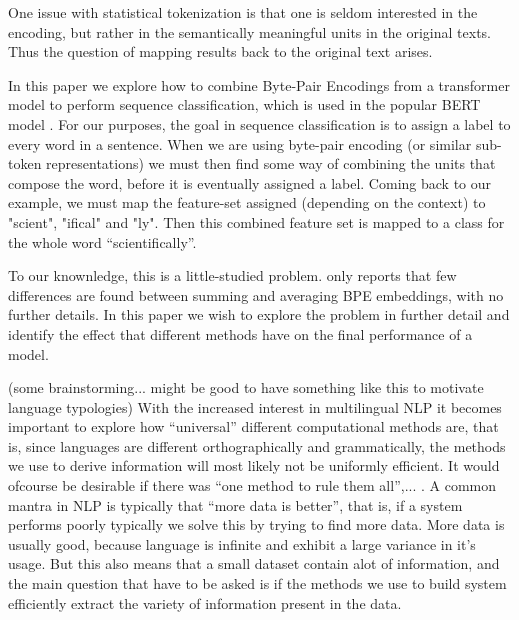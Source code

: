 \documentclass[11pt]{article}
\newcommand\citet{\newcite}
\newcommand\citep{\cite}
\begin{document}
            One issue with statistical tokenization is that one is
     seldom interested in the encoding, but rather in the semantically
     meaningful units in the original texts. Thus the question of
     mapping results back to the original text arises.
        
        	In this paper we explore how to combine Byte-Pair
     Encodings from a transformer model to perform sequence
     classification, which is used in the popular BERT model
     \citep{devlin2018bert}. For our purposes, the goal in sequence
     classification is to assign a label to every word in a
     sentence. When we are using byte-pair encoding (or similar
     sub-token representations) we must then find some way of
     combining the units that compose the word, before it is
     eventually assigned a label. Coming back to our example, we must
     map the feature-set assigned (depending on the context) to
     "scient", "ifical" and "ly". Then this combined feature set is
     mapped to a class for the whole word ``scientifically''.

            	To our knownledge, this is a little-studied
     problem. \citet{kondratyukstraka} only reports that few
     differences are found between summing and averaging BPE
     embeddings, with no further details. In this paper we wish to
     explore the problem in further detail and identify the effect
     that different methods have on the final performance of a model.

                 (some brainstorming... might be good to have
     something like this to motivate language typologies) With the
     increased interest in multilingual NLP it becomes important to
     explore how ``universal'' different computational methods are,
     that is, since languages are different orthographically and
     grammatically, the methods we use to derive information will most
     likely not be uniformly efficient. It would ofcourse be desirable
     if there was ``one method to rule them all'',... .  A common
     mantra in NLP is typically that ``more data is better'', that is,
     if a system performs poorly typically we solve this by trying to
     find more data. More data is usually good, because language is
     infinite and exhibit a large variance in it's usage. But this
     also means that a small dataset contain alot of information, and
     the main question that have to be asked is if the methods we use
     to build system efficiently extract the variety of information
     present in the data.
\end{document}

